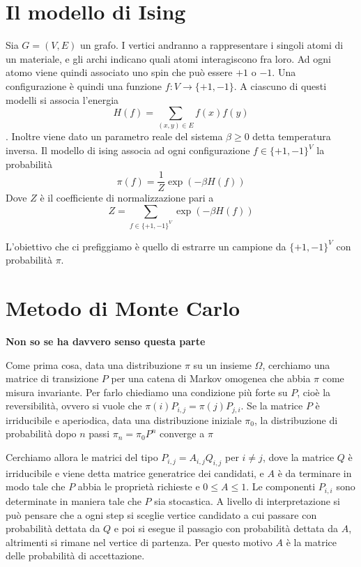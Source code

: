 \documentclass[]{marticle}
\begin{document}
\section{Il modello di Ising}
Sia $G=(V,E)$ un grafo. I vertici andranno a rappresentare i singoli atomi di un
materiale, e gli archi indicano quali atomi interagiscono fra loro. Ad ogni
atomo viene quindi associato uno spin che pu\`o essere $+1$ o $-1$. Una
configurazione \`e quindi una funzione $f\colon V \rightarrow \{+1, -1\}$. A
ciascuno di questi modelli si associa l'energia 
\[
    H(f) = \sum_{(x,y)\in E} f(x)f(y)
\].
Inoltre viene dato un parametro reale del sistema $\beta \geq 0$ detta
temperatura inversa. Il modello di ising associa ad ogni configurazione $f \in
\{+1, -1\}^V$ la probabilit\`a
\[
    \pi(f) = \frac{1}{Z} \exp(-\beta H(f))
\]
Dove $Z$ \`e il coefficiente di normalizzazione pari a
\[
    Z = \sum_{f \in \{+1,-1\}^V} \exp(-\beta H(f))
\]

L'obiettivo che ci prefiggiamo \`e quello di estrarre un campione da
$\{+1,-1\}^V$ con probabilit\`a $\pi$.

\section{Metodo di Monte Carlo}

\textbf{Non so se ha davvero senso questa parte}

Come prima cosa, data una distribuzione $\pi$ su un insieme $\Omega$, cerchiamo
una matrice di transizione $P$ per una catena di Markov omogenea che abbia
$\pi$ come misura invariante. Per farlo chiediamo una condizione pi\`u forte su
$P$, cio\`e la reversibilit\`a, ovvero si vuole che $\pi (i)P_{i,j}=\pi
(j)P_{j,i}$. Se la matrice $P$ \`e irriducibile e aperiodica, data una
distribuzione iniziale $\pi_0$, la distribuzione di probabilit\`a dopo $n$ passi
$\pi_n = \pi_0 P^n$ converge a $\pi$

Cerchiamo allora le matrici del tipo $P_{i,j} = A_{i,j} Q_{i,j}$ per $i\neq j$,
dove la matrice $Q$ \`e irriducibile e viene detta matrice generatrice dei
candidati, e $A$ \`e da terminare in modo tale che $P$ abbia le propriet\`a
richieste e $0\leq A \leq 1$. Le componenti $P_{i,i}$ sono determinate in
maniera tale che $P$ sia stocastica.  A livello di interpretazione si pu\`o
pensare che a ogni step si sceglie vertice candidato a cui passare con
probabilit\`a dettata da $Q$ e poi si esegue il passagio con probabilit\`a
dettata da $A$, altrimenti si rimane nel vertice di partenza. Per questo motivo
$A$ \`e la matrice delle probabilit\`a di accettazione. 
\end{document}
